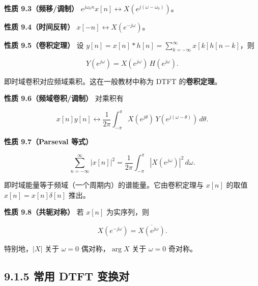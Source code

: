 \textbf{性质 9.3（频移/调制）}
\(e^{j\omega_0 n}x[n]\leftrightarrow X(e^{j(\omega-\omega_0)})\)。

\textbf{性质 9.4（时间反转）} \(x[-n]\leftrightarrow X(e^{-j\omega})\)。

\textbf{性质 9.5（卷积定理）} 设
\(y[n]=x[n]*h[n]=\sum_{k=-\infty}^{\infty}x[k]h[n-k]\)，则

\[
Y(e^{j\omega}) = X(e^{j\omega})\,H(e^{j\omega}).
\]

即时域卷积对应频域乘积。这在一般教材中称为 DTFT 的\textbf{卷积定理}。

\textbf{性质 9.6（频域卷积/调制）} 对乘积有

\[
x[n]y[n] \leftrightarrow \frac{1}{2\pi}\int_{-\pi}^{\pi} X(e^{j\theta})\,Y(e^{j(\omega-\theta)})\,d\theta .
\]

\textbf{性质 9.7（Parseval 等式）}

\[
\sum_{n=-\infty}^{\infty} |x[n]|^2 = \frac{1}{2\pi}\int_{-\pi}^{\pi} |X(e^{j\omega})|^2\,d\omega .
\]

即时域能量等于频域（一个周期内）的谱能量。它由卷积定理与 \(x[n]\) 的取值
\(x[n]=x[n]\delta[n]\) 推出。

\textbf{性质 9.8（共轭对称）} 若 \(x[n]\) 为实序列，则

\[
X(e^{-j\omega}) = \overline{X(e^{j\omega})}.
\]

特别地，\(|X|\) 关于 \(\omega=0\) 偶对称，\(\arg X\) 关于 \(\omega=0\)
奇对称。

\subsection{9.1.5 常用 DTFT
变换对}\label{ux5e38ux7528-dtft-ux53d8ux6362ux5bf9}

